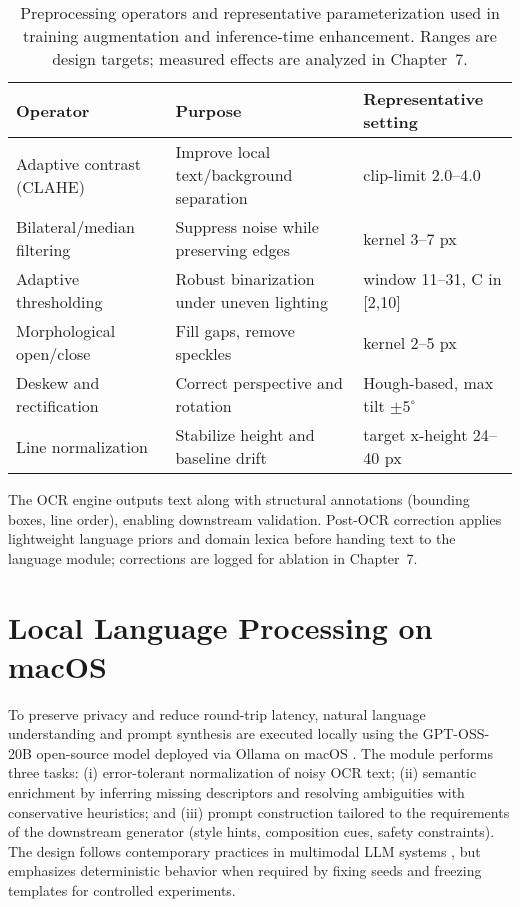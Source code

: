 \begin{table}[t]
  \centering
  \caption{Preprocessing operators and representative parameterization used in training augmentation and inference-time enhancement. Ranges are design targets; measured effects are analyzed in Chapter~7.}
  \label{tab:preproc}
  \begin{tabular}{l l l}
    \hline
    Operator & Purpose & Representative setting \\
    \hline
    Adaptive contrast (CLAHE) & Improve local text/background separation & clip-limit 2.0--4.0 \\
    Bilateral/median filtering & Suppress noise while preserving edges & kernel 3--7 px \\
    Adaptive thresholding & Robust binarization under uneven lighting & window 11--31, C in [2,10] \\
    Morphological open/close & Fill gaps, remove speckles & kernel 2--5 px \\
  Deskew and rectification & Correct perspective and rotation & Hough-based, max tilt $\pm 5^{\circ}$ \\
    Line normalization & Stabilize height and baseline drift & target x-height 24--40 px \\
    \hline
  \end{tabular}
\end{table}

The OCR engine outputs text along with structural annotations (bounding boxes, line order), enabling downstream validation. Post-OCR correction applies lightweight language priors and domain lexica before handing text to the language module; corrections are logged for ablation in Chapter~7.

\section{Local Language Processing on macOS}

To preserve privacy and reduce round-trip latency, natural language understanding and prompt synthesis are executed locally using the GPT-OSS-20B open-source model deployed via Ollama on macOS \cite{openai2025gptoss}. The module performs three tasks: (i) error-tolerant normalization of noisy OCR text; (ii) semantic enrichment by inferring missing descriptors and resolving ambiguities with conservative heuristics; and (iii) prompt construction tailored to the requirements of the downstream generator (style hints, composition cues, safety constraints). The design follows contemporary practices in multimodal LLM systems \cite{qin2024comprehensive, jin2024mm}, but emphasizes deterministic behavior when required by fixing seeds and freezing templates for controlled experiments.

